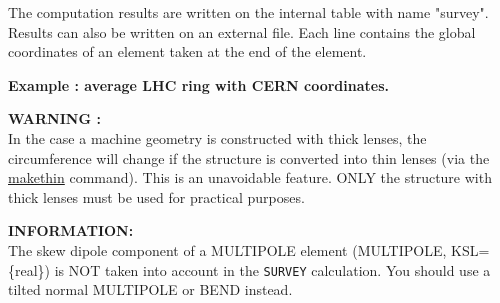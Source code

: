 The computation results are written on the internal
table with name "survey". Results can also be written on an external
file. Each line contains the global coordinates of an element taken at
the end of the element.  

{\bf Example : average LHC ring with CERN coordinates.}


{\bf WARNING :}\\
In the case a machine geometry is constructed with thick
lenses, the circumference will change if the structure is converted into
thin lenses (via the \href{../makethin/makethin.html}{makethin}
command). This is an unavoidable feature. ONLY the structure with thick
lenses must be used for practical purposes.


{\bf INFORMATION:}\\
The skew dipole component of a MULTIPOLE element
(MULTIPOLE, KSL=\{real\}) is NOT taken into account in the \texttt{SURVEY}
calculation. You should use a tilted normal MULTIPOLE or BEND instead.


